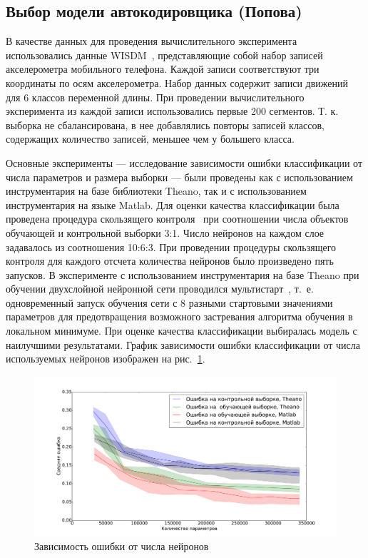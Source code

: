 \subsection{Выбор модели автокодировщика (Попова)}
В качестве данных для проведения вычислительного эксперимента использовались данные WISDM~\cite{wisdm}, представляющие собой набор записей акселерометра мобильного телефона. Каждой записи соответствуют три координаты по осям акселерометра. Набор данных содержит записи движений для 6 классов переменной длины.
При проведении вычислительного эксперимента из каждой записи использовались первые 200 сегментов. Т. к. выборка не сбалансирована, в нее добавлялись повторы записей классов, содержащих количество записей, меньшее чем у большего класса.

Основные эксперименты --- исследование зависимости ошибки классификации от числа параметров и размера выборки --- были проведены как с использованием инструментария на базе библиотеки Theano, так и с использованием инструментария на языке Matlab.
Для оценки качества классификации была проведена процедура скользящего контроля~\cite{cv} при соотношении числа объектов обучающей и контрольной выборки 3:1. Число нейронов на каждом слое задавалось из соотношения 10:6:3. При проведении процедуры скользящего контроля для каждого отсчета количества нейронов было произведено пять запусков. В эксперименте с использованием инструментария на базе Theano при обучении двухслойной нейронной сети проводился мультистарт~\cite{multi}, т.~е. одновременный запуск обучения сети с 8 разными стартовыми значениями параметров для предотвращения возможного застревания алгоритма обучения в локальном минимуме. При оценке качества классификации выбиралась модель с наилучшими результатами. График зависимости ошибки классификации от числа используемых нейронов изображен на рис.~\ref{fig:neurons}.



\begin{figure}[tb!]
 \centering
  \includegraphics[width=1.0\textwidth]{plots/popova/neurons.pdf}
 \caption{Зависимость ошибки     от числа нейронов}
 \label{fig:neurons}
\end{figure}


